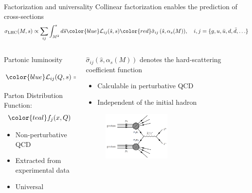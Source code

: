 \documentclass[aspectratio=169, 8pt,t]{beamer}
\begin{document}
\begin{frame}{Factorization and universality}
  Collinear factorization enables the prediction of cross-sections
  \begin{equation*}
    \sigma_{\mathrm{LHC}}(M, s) \propto \sum_{i j} \int_{M^2}^s d \hat{s} {\color{blue}\mathcal{L}_{i j}(\hat{s}, s)} {\color{red}\hat{\sigma}_{i j}\left(\hat{s}, \alpha_s(M)\right)}, \quad i,j = \{g, u, \bar{u}, d, \bar{d}, \ldots\}
  \end{equation*}

  \begin{columns}
    \begin{column}{0.49\textwidth}
      Partonic luminosity
      \begin{equation*}
        {\color{blue}\mathcal{L}_{i j}(Q, s)}=\frac{1}{s} \int_{Q^2 / s}^1 \frac{d x}{x} {\color{teal}f_i\left(\frac{Q^2}{s x}, Q\right) f_j(x, Q)}
      \end{equation*}
      Parton Distribution Function:
      \begin{equation*}
        {\color{teal} f_j(x,Q)}
      \end{equation*}
      \begin{itemize}
        \item Non-perturbative QCD
        \item Extracted from experimental data
        \item Universal
      \end{itemize}
    \end{column}

    \begin{column}{0.49\textwidth}
      {\color{red} $\hat{\sigma}_{i j}\left(\hat{s}, \alpha_s(M)\right)$} denotes the hard-scattering coefficient function
      \begin{itemize}
        \item Calculable in perturbative QCD
        \item Independent of the initial hadron
      \end{itemize}
      \begin{figure}
        \includegraphics[width=0.5\textwidth]{figures/dy.png}
      \end{figure}
    \end{column}
  \end{columns}
\end{frame}
\end{document}

